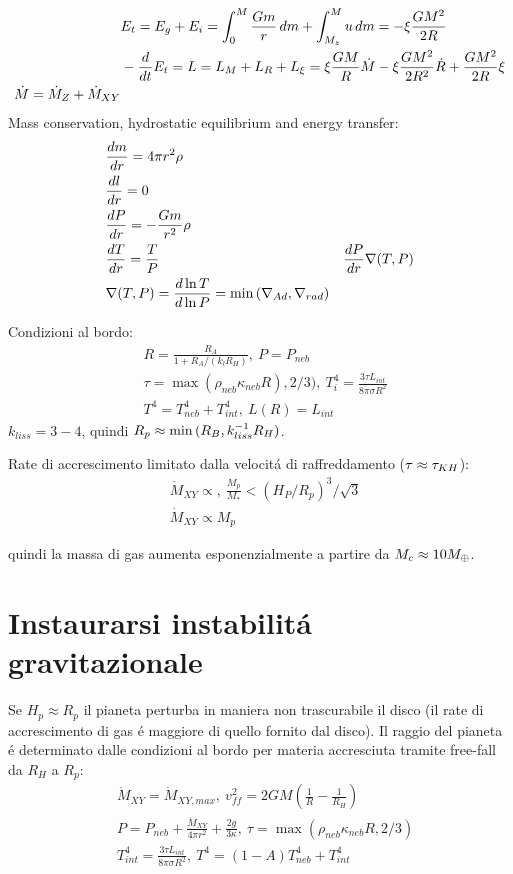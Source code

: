 \begin{workout}
\begin{align}
&E_t=E_g+E_i=\int_0^M\frac{Gm}{r}\,dm+\int_{M_z}^Mu\,dm=-\xi\frac{GM^2}{2R}\\
&-\TDof{t}E_t=L=L_M+L_R+L_{\xi}=\xi\frac{GM}{R}\dot{M}-\xi\frac{GM^2}{2R^2}\dot{R}+\frac{GM^2}{2R}\xi\\
\dot{M}=\dot{M}_Z+\dot{M}_{XY}
\end{align}
Mass conservation, hydrostatic equilibrium and energy transfer:
\begin{align}
&\TDy{r}{m}=4\pi r^2\rho\\
&\TDy{r}{l}=0\\
&\TDy{r}{P}=-\frac{Gm}{r^2}\rho\\
&\TDy{r}{T}=\frac{T}{P}&\TDy{r}{P}\nabla(T,P)\\
&\nabla(T,P)=\TDly{P}{T}=\min{(\nad{},\nrad{})}
\end{align}

Condizioni al bordo:
\begin{align}
&R=\frac{R_A}{1+R_A/(k_lR_H )},\ P=P_{neb}\\
&\tau=\max{(\rho_{neb}\kappa_{neb}R),2/3)},\ T_i^4=\frac{3\tau L_{int}}{8\pi\sigma R^2}\\
&T^4=T_{neb}^4+T_{int}^4,\ L(R)=L_{int}
\end{align}
$k_{liss}=3-4$, quindi $R_p\approx \min{(R_B,k_{liss}\expy{-1}R_H)}$.
\end{workout}

Rate di accrescimento limitato dalla velocit\'a di raffreddamento ($\tau\approx\tkh{}$):
\begin{align}
&\dot{M}_{XY}\propto,\ \frac{M_p}{M_*}<(H_P/R_p)^3/\sqrt{3}\\
&\dot{M}_{XY}\propto M_p
\end{align}

quindi la massa di gas aumenta esponenzialmente a partire da $M_c\approx10\mearth{}$.

\section{Instaurarsi instabilit\'a gravitazionale}

Se $H_p\approx R_p$ il pianeta perturba in maniera non trascurabile il disco (il rate di accrescimento di gas \'e maggiore di quello fornito dal disco). Il raggio del pianeta \'e determinato dalle condizioni al bordo per materia accresciuta tramite free-fall da $R_H$ a $R_p$:
\begin{align}
&\dot{M}_{XY}=\dot{M}_{XY,max},\ v_{ff}^2=2GM(\frac{1}{R}-\frac{1}{R_H})\\
&P=P_{neb}+\frac{\dot{M}_{XY}}{4\pi r^2}+\frac{2g}{3\kappa},\ \tau=\max{(\rho_{neb}\kappa_{neb}R,2/3)}\\
&T_{int}^4=\frac{3\tau L_{int}}{8\pi\sigma R^2},\ T^4=(1-A)T_{neb}^4+T_{int}^4
\end{align}


